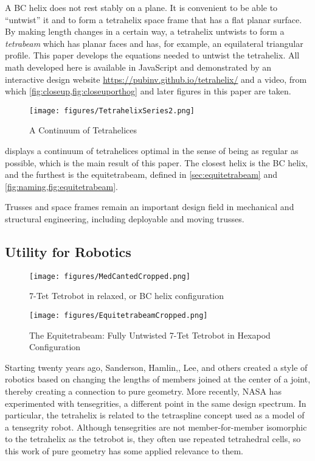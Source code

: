 \documentclass[10pt,final]{journals-1.0/asme2ej}
\begin{document}
A BC helix does not rest stably on a plane. It is convenient to
be able to ``untwist'' it and to form a tetrahelix space frame that has a
flat planar surface. By making length changes in a certain way, a tetrahelix untwists to form a \emph{tetrabeam} which has planar faces
and has, for example, an equilateral triangular profile. This paper
develops the equations needed to untwist the tetrahelix. All math
developed here is available in JavaScript and demonstrated by an interactive
design website \url{https://pubinv.github.io/tetrahelix/}\cite{readtetrahelix}
and a video\cite{tetrahelixvideo},
from which \cref{fig:closeup,fig:closeuporthog} and later figures in this paper 
are taken.

\begin{figure}
  \centering
     \texttt{[image: figures/TetrahelixSeries2.png]}
     \caption{A Continuum of Tetrahelices}
  \label{fig:series}
\end{figure}


 displays a continuum of tetrahelices optimal in the sense of being
as regular as possible,
which is the main result of this
paper. The closest helix is the BC helix, and the furthest
is the equitetrabeam, defined in \cref{sec:equitetrabeam} and \cref{fig:naming,fig:equitetrabeam}.

Trusses and space frames remain an important design field in
mechanical and structural engineering\cite{mikulas1985sequentially},
including deployable and moving trusses\cite{claypool2012readily,gezgin2017new}.

\subsection{Utility for Robotics}

\begin{figure}
  \centering
     \texttt{[image: figures/MedCantedCropped.png]}
     \caption{7-Tet Tetrobot in relaxed, or BC helix configuration}
     \texttt{[image: figures/EquitetrabeamCropped.png]}
     \caption{The Equitetrabeam: Fully Untwisted 7-Tet Tetrobot in Hexapod Configuration}
     \label{fig:tetrobot}
\end{figure}

Starting twenty years ago, Sanderson\cite{sanderson1996modular},
Hamlin,\cite{TetrobotBook}, Lee\cite{lee2002dynamic}, and others
 created a style of robotics based on changing
the lengths of members joined at the center of a joint, thereby
creating a connection to pure geometry. More recently, NASA has
experimented with tensegrities\cite{NTRT,chen2017soft}, a different point in the
same design spectrum. In particular, the tetrahelix is related to the
tetraspline\cite{mirletz2014} concept used as a model of a tensegrity robot.
Although tensegrities are not member-for-member isomorphic to the tetrahelix
as the tetrobot is, they often use repeated tetrahedral cells, so this
work of pure geometry has some applied relevance to them.
\end{document}
